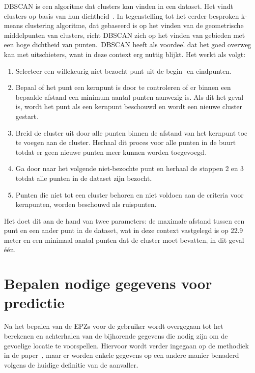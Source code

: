 \ac{DBSCAN} is een algoritme dat clusters kan vinden in een dataset. Het vindt
clusters op basis van hun dichtheid~\cite{KMeansvs80:online}. In tegenstelling tot het eerder besproken
k-means clustering algoritme, dat gebaseerd is
op het vinden van de geometrische middelpunten van clusters, richt \ac{DBSCAN}
zich op het vinden van gebieden met een hoge dichtheid van punten.\ \ac{DBSCAN}
heeft als voordeel dat het goed overweg kan met uitschieters, want in deze
context erg nuttig blijkt. Het werkt als volgt:
\begin{enumerate}
    \item Selecteer een willekeurig niet-bezocht punt uit de begin- en eindpunten.
    \item Bepaal of het punt een kernpunt is door te controleren of er binnen een
          bepaalde afstand een minimum aantal punten aanwezig is. Als dit het geval is,
          wordt het punt als een kernpunt beschouwd en wordt een nieuwe cluster gestart.
    \item Breid de cluster uit door alle punten binnen de afstand van het kernpunt toe te
          voegen aan de cluster. Herhaal dit proces voor alle punten in de buurt totdat
          er geen nieuwe punten meer kunnen worden toegevoegd.
    \item Ga door naar het volgende niet-bezochte punt en herhaal de stappen 2 en 3
          totdat alle punten in de dataset zijn bezocht.
    \item Punten die niet tot een cluster behoren en niet voldoen aan de criteria voor
          kernpunten, worden beschouwd als ruispunten.
\end{enumerate}
Het doet dit aan de hand van twee parameters: de maximale afstand tussen een punt en
een ander punt in de dataset, wat in deze context vastgelegd is op 22.9 meter en een minimaal aantal punten dat de cluster moet
bevatten, in dit geval één.

\section{Bepalen nodige gegevens voor predictie}
Na het bepalen van de \acp{EPZ} voor de gebruiker wordt overgegaan tot het
berekenen en achterhalen van de bijhorende gegevens die nodig zijn om de
gevoelige locatie te voorspellen. Hiervoor wordt verder ingegaan op de
methodiek in de paper~\citeauthor{Dhondt}, maar er worden enkele gegevens op
een andere manier benaderd volgens de huidige definitie van de aanvaller.

